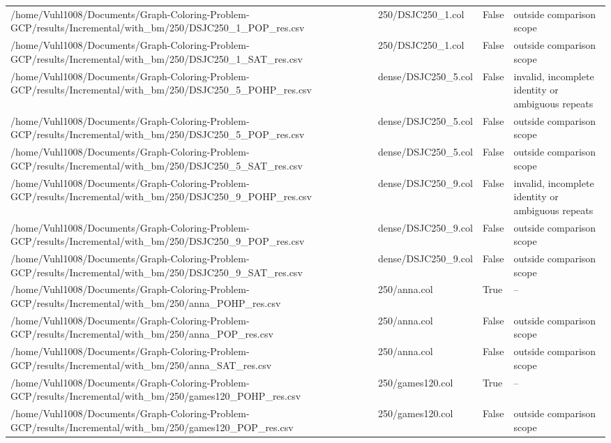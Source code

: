\begin{table}[htbp]
\begin{tabular}{llll}
/home/Vuhl1008/Documents/Graph-Coloring-Problem-GCP/results/Incremental/with\_bm/250/DSJC250\_1\_POP\_res.csv & 250/DSJC250\_1.col & False & outside comparison scope \\
/home/Vuhl1008/Documents/Graph-Coloring-Problem-GCP/results/Incremental/with\_bm/250/DSJC250\_1\_SAT\_res.csv & 250/DSJC250\_1.col & False & outside comparison scope \\
/home/Vuhl1008/Documents/Graph-Coloring-Problem-GCP/results/Incremental/with\_bm/250/DSJC250\_5\_POHP\_res.csv & dense/DSJC250\_5.col & False & invalid, incomplete identity or ambiguous repeats \\
/home/Vuhl1008/Documents/Graph-Coloring-Problem-GCP/results/Incremental/with\_bm/250/DSJC250\_5\_POP\_res.csv & dense/DSJC250\_5.col & False & outside comparison scope \\
/home/Vuhl1008/Documents/Graph-Coloring-Problem-GCP/results/Incremental/with\_bm/250/DSJC250\_5\_SAT\_res.csv & dense/DSJC250\_5.col & False & outside comparison scope \\
/home/Vuhl1008/Documents/Graph-Coloring-Problem-GCP/results/Incremental/with\_bm/250/DSJC250\_9\_POHP\_res.csv & dense/DSJC250\_9.col & False & invalid, incomplete identity or ambiguous repeats \\
/home/Vuhl1008/Documents/Graph-Coloring-Problem-GCP/results/Incremental/with\_bm/250/DSJC250\_9\_POP\_res.csv & dense/DSJC250\_9.col & False & outside comparison scope \\
/home/Vuhl1008/Documents/Graph-Coloring-Problem-GCP/results/Incremental/with\_bm/250/DSJC250\_9\_SAT\_res.csv & dense/DSJC250\_9.col & False & outside comparison scope \\
/home/Vuhl1008/Documents/Graph-Coloring-Problem-GCP/results/Incremental/with\_bm/250/anna\_POHP\_res.csv & 250/anna.col & True & -- \\
/home/Vuhl1008/Documents/Graph-Coloring-Problem-GCP/results/Incremental/with\_bm/250/anna\_POP\_res.csv & 250/anna.col & False & outside comparison scope \\
/home/Vuhl1008/Documents/Graph-Coloring-Problem-GCP/results/Incremental/with\_bm/250/anna\_SAT\_res.csv & 250/anna.col & False & outside comparison scope \\
/home/Vuhl1008/Documents/Graph-Coloring-Problem-GCP/results/Incremental/with\_bm/250/games120\_POHP\_res.csv & 250/games120.col & True & -- \\
/home/Vuhl1008/Documents/Graph-Coloring-Problem-GCP/results/Incremental/with\_bm/250/games120\_POP\_res.csv & 250/games120.col & False & outside comparison scope \\

\end{tabular}
\end{table}
